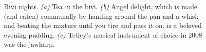 \begin{figure}[t!]
    \begin{subfigure}[t]{0.49\textwidth}
        \centering
        \caption{} \label{jarvist anal}
    \end{subfigure}
    \hfill
    \begin{subfigure}[t]{0.49\textwidth}
        \centering
        \caption{} \label{tetley jawharp}
    \end{subfigure}

    \caption{Bivi nights.
    \emph{(a)} Tea in the bivi.    \emph{(b)} Angel delight, which is made (and eaten) communally by handing around the pan and a whisk and beating the mixture until you tire and pass it on, is a beloved evening pudding.
    \emph{(c)} Tetley's musical instrument of choice in 2008 was the jawharp. }
\end{figure}